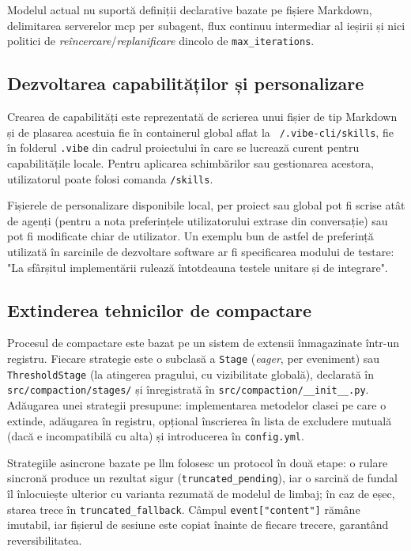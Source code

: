 \documentclass[12pt, a4paper, oneside, romanian]{teza-upb}
\begin{document}
    Modelul actual nu suportă definiții declarative bazate pe fișiere Markdown, delimitarea serverelor \ac{mcp} per subagent, flux continuu intermediar al ieșirii și nici politici de \emph{reîncercare}/\emph{replanificare} dincolo de \texttt{max\_iterations}.

    \subsection{Dezvoltarea capabilităților și personalizare}

    Crearea de capabilități este reprezentată de scrierea unui fișier de tip Markdown și de plasarea acestuia fie în containerul global aflat la \texttt{~/.vibe-cli/skills}, fie 
    în folderul \texttt{.vibe} din cadrul proiectului în care se lucrează curent pentru capabilitățile locale. Pentru aplicarea schimbărilor sau gestionarea acestora, utilizatorul poate folosi comanda \texttt{/skills}.

    Fișierele de personalizare disponibile local, per proiect sau global pot fi scrise atât de agenți (pentru a nota preferințele utilizatorului extrase din conversație) sau pot fi modificate chiar de utilizator. Un exemplu bun de astfel de preferință utilizată în sarcinile de dezvoltare software ar fi
    specificarea modului de testare: "La sfârșitul implementării rulează întotdeauna testele unitare și de integrare".

    \subsection{Extinderea tehnicilor de compactare}

    Procesul de compactare este bazat pe un sistem de extensii înmagazinate într-un registru. Fiecare strategie este o subclasă a \texttt{Stage} (\emph{eager}, per eveniment) sau \texttt{ThresholdStage} (la atingerea pragului, cu vizibilitate globală), declarată în \texttt{src/compaction/stages/} și înregistrată în \texttt{src/compaction/\_\_init\_\_.py}. Adăugarea unei strategii presupune: implementarea metodelor clasei pe care o extinde, adăugarea în registru, opțional înscrierea în lista de excludere mutuală (dacă e incompatibilă cu alta) și introducerea în \texttt{config.yml}.

    Strategiile asincrone bazate pe \ac{llm} folosesc un protocol în două etape: o rulare sincronă produce un rezultat sigur (\texttt{truncated\_pending}), iar o sarcină de fundal îl înlocuiește ulterior cu varianta rezumată de modelul de limbaj; în caz de eșec, starea trece în \texttt{truncated\_fallback}. Câmpul \texttt{event["content"]} rămâne imutabil, iar fișierul de sesiune este copiat înainte de fiecare trecere, garantând reversibilitatea.
\end{document}
